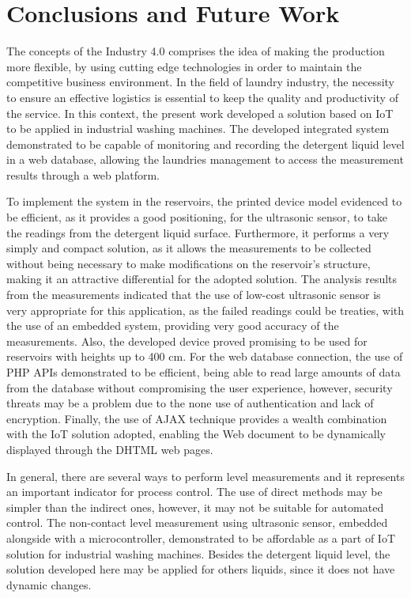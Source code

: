 \chapter{Conclusions and Future Work}\label{cap:conclusions}

The concepts of the Industry 4.0 comprises the idea of making the production more flexible, by using cutting edge technologies in order to maintain the competitive business environment. In the field of laundry industry, the necessity to ensure an effective logistics is essential to keep the quality and productivity of the service. In this context, the present work developed a solution based on \gls{IoT} to be applied in industrial washing machines. The developed integrated system demonstrated to be capable of monitoring and recording the detergent liquid level in a web database, allowing the laundries management to access the measurement results through a web platform.

To implement the system in the reservoirs, the printed device model evidenced to be efficient, as it provides a good positioning, for the ultrasonic sensor, to take the readings from the detergent liquid surface. Furthermore, it performs a very simply and compact solution, as it allows the measurements to be collected without being necessary to make modifications on the reservoir's structure, making it an attractive differential for the adopted solution. The analysis results from the measurements indicated that the use of low-cost ultrasonic sensor is very appropriate for this application, as the failed readings could be treaties, with the use of an embedded system, providing very good accuracy of the measurements. Also, the developed device proved promising to be used for reservoirs with heights up to 400 cm. For the web database connection, the use of \gls{PHP} \gls{API}s demonstrated to be efficient, being able to read large amounts of data from the database without compromising the user experience, however, security threats may be a problem due to the none use of authentication and lack of encryption. Finally, the use of \gls{AJAX} technique provides a wealth combination with the \gls{IoT} solution adopted, enabling the Web document to be dynamically displayed through the \gls{DHTML} web pages.

In general, there are several ways to perform level measurements and it represents an important indicator for process control. The use of direct methods may be simpler than the indirect ones, however, it may not be suitable for automated control. The non-contact level measurement using ultrasonic sensor, embedded alongside with a microcontroller, demonstrated to be affordable as a part of \gls{IoT} solution for industrial washing machines. Besides the detergent liquid level, the solution developed here may be applied for others liquids, since it does not have dynamic changes.

